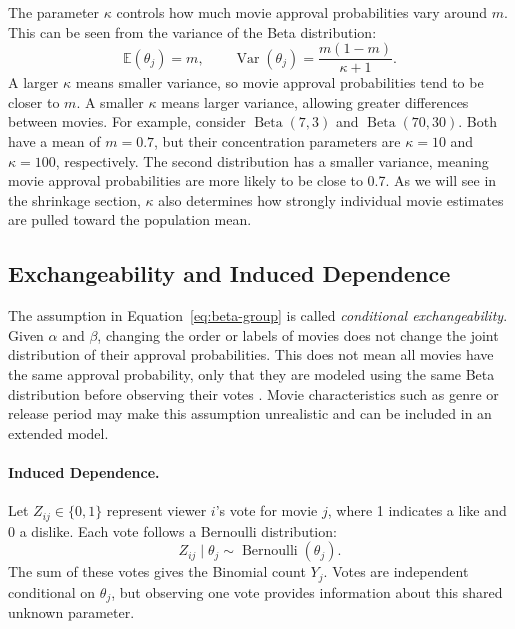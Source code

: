 \documentclass[11pt,a4paper]{article}
\newcommand{\E}{\mathbb{E}}
\newcommand{\Var}{\operatorname{Var}}
\newcommand{\BetaD}{\operatorname{Beta}}
\newcommand{\Bern}{\operatorname{Bernoulli}}
\begin{document}
The parameter $\kappa$ controls how much movie approval probabilities vary around $m$. This can be seen from the variance of the Beta distribution: 
\begin{equation}
\E(\theta_j)=m,
\qquad
\Var(\theta_j)=\frac{m(1-m)}{\kappa+1}.
\label{eq:beta-moments}
\end{equation}
A larger $\kappa$ means smaller variance, so movie approval probabilities tend to be closer to $m$. A smaller $\kappa$ means larger variance, allowing greater differences between movies. For example, consider $\BetaD(7,3)$ and $\BetaD(70,30)$. Both have a mean of $m=0.7$, but their concentration parameters are $\kappa=10$ and $\kappa=100$, respectively. The second distribution has a smaller variance, meaning movie approval probabilities are more likely to be close to 0.7. As we will see in the shrinkage section, $\kappa$ also determines how strongly individual movie estimates are pulled toward the population mean.

\subsection{Exchangeability and Induced Dependence}

The assumption in Equation~\eqref{eq:beta-group} is called \emph{conditional exchangeability}. Given $\alpha$ and $\beta$, changing the order or labels of movies does not change the joint distribution of their approval probabilities. This does not mean all movies have the same approval probability, only that they are modeled using the same Beta distribution before observing their votes \cite{gelmanetal2013}. Movie characteristics such as genre or release period may make this assumption unrealistic and can be included in an extended model.

\paragraph{Induced Dependence.}

Let $Z_{ij}\in\{0,1\}$ represent viewer $i$'s vote for movie $j$, where 1 indicates a like and 0 a dislike. Each vote follows a Bernoulli distribution:
\begin{equation}
Z_{ij}\mid\theta_j\sim\Bern(\theta_j).
\end{equation}
The sum of these votes gives the Binomial count $Y_j$. Votes are independent conditional on $\theta_j$, but observing one vote provides information about this shared unknown parameter.
\end{document}
